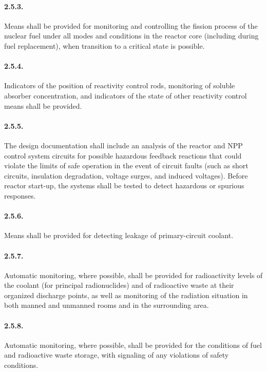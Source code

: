 \documentclass[openright]{bookest}
\begin{document}
\paragraph{2.5.3.}
Means shall be provided for monitoring and controlling the fission process of the nuclear fuel under all modes and conditions in the reactor core (including during fuel replacement), when transition to a critical state is possible.

\paragraph{2.5.4.}
Indicators of the position of reactivity control rods, monitoring of soluble absorber concentration, and indicators of the state of other reactivity control means shall be provided.

\paragraph{2.5.5.}
The design documentation shall include an analysis of the reactor and NPP control system circuits for possible hazardous feedback reactions that could violate the limits of safe operation in the event of circuit faults (such as short circuits, insulation degradation, voltage surges, and induced voltages).  
Before reactor start-up, the systems shall be tested to detect hazardous or spurious responses.

\paragraph{2.5.6.}
Means shall be provided for detecting leakage of primary-circuit coolant.

\paragraph{2.5.7.}
Automatic monitoring, where possible, shall be provided for radioactivity levels of the coolant (for principal radionuclides) and of radioactive waste at their organized discharge points, as well as monitoring of the radiation situation in both manned and unmanned rooms and in the surrounding area.

\paragraph{2.5.8.}
Automatic monitoring, where possible, shall be provided for the conditions of fuel and radioactive waste storage, with signaling of any violations of safety conditions.
\end{document}
